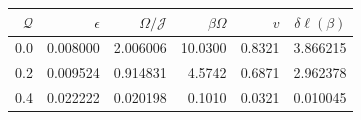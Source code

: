 \begin{tabular}{rrrrrr}\toprule
$\mathcal Q$ & $\epsilon$ & $\Omega/\mathcal J$ & $\beta\Omega$ & $v$ & $\delta\ell(\beta)$\\\midrule
0.0 & 0.008000 & 2.006006 & 10.0300 & 0.8321 & 3.866215 \\
0.2 & 0.009524 & 0.914831 & 4.5742 & 0.6871 & 2.962378 \\
0.4 & 0.022222 & 0.020198 & 0.1010 & 0.0321 & 0.010045 \\
\bottomrule\end{tabular}
